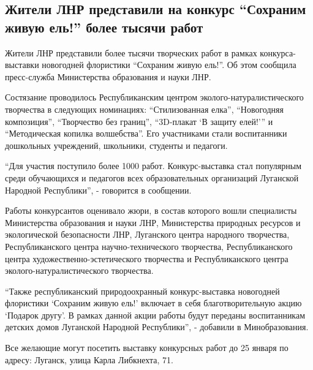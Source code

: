  
 
 
 
 
\subsection{Жители ЛНР представили на конкурс \enquote{Сохраним живую ель!} более тысячи работ}
\label{sec:21_12_2021.stz.news.lnr.lug_info.1.konkurs_floristika}


Жители ЛНР представили более тысячи творческих работ в рамках конкурса-выставки
новогодней флористики \enquote{Сохраним живую ель!}. Об этом сообщила
пресс-служба Министерства образования и науки ЛНР.


Состязание проводилось Республиканским центром эколого-натуралистического
творчества в следующих номинациях: \enquote{Стилизованная елка}, \enquote{Новогодняя
композиция}, \enquote{Творчество без границ}, \enquote{3D-плакат \enquote{В защиту елей!}} и
\enquote{Методическая копилка волшебства}. Его участниками стали воспитанники
дошкольных учреждений, школьники, студенты и педагоги. 


\enquote{Для участия поступило более 1000 работ. Конкурс-выставка стал популярным среди
обучающихся и педагогов всех образовательных организаций Луганской Народной
Республики}, - говорится в сообщении.


Работы конкурсантов оценивало жюри, в состав которого вошли специалисты
Министерства образования и науки ЛНР, Министерства природных ресурсов и
экологической безопасности ЛНР, Луганского центра народного творчества,
Республиканского центра научно-технического творчества, Республиканского центра
художественно-эстетического творчества и Республиканского центра
эколого-натуралистического творчества.

\enquote{Также республиканский природоохранный конкурс-выставка новогодней
флористики \enquote{Сохраним живую ель!} включает в себя благотворительную
акцию \enquote{Подарок другу}.  В рамках данной акции работы будут переданы
воспитанникам детских домов Луганской Народной Республики}, - добавили в
Минобразования.

Все желающие могут посетить выставку конкурсных работ до 25 января по адресу:
Луганск, улица Карла Либкнехта, 71.
